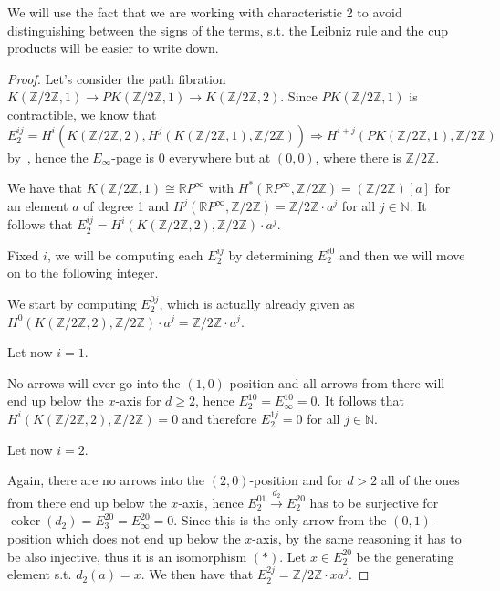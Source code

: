 \documentclass{article}
\newcommand{\numberset}{\mathbb}
\newcommand{\N}{\numberset{N}}
\newcommand{\Z}{\numberset{Z}}
\newcommand{\R}{\numberset{R}}
\newcommand{\RP}{\R P^\infty}
\newcommand{\exercise}[1]{\noindent {\bf Exercise #1}}
\DeclareMathOperator{\coker}{coker}
\begin{document}
\title{}

\author{Matteo Durante, s2303760, Leiden University}

\maketitle

\exercise{2}

    We will use the fact that we are working with characteristic 2 to avoid
    distinguishing between the signs of the terms, s.t. the Leibniz rule and the
    cup products will be easier to write down.

\begin{proof}
    Let's consider the path fibration $K(\Z/2\Z,1)\rightarrow
    PK(\Z/2\Z,1)\rightarrow K(\Z/2\Z,2)$. Since $PK(\Z/2\Z,1)$ is contractible,
    we know that $E^{ij}_2=H^i(K(\Z/2\Z,2),H^j(K(\Z/2\Z,1),\Z/2\Z))\Rightarrow
    H^{i+j}(PK(\Z/2\Z,1),\Z/2\Z)$ by~\cite[thm. 9.5]{HM19}, hence the
    $E_\infty$-page is 0 everywhere but at $(0,0)$, where there is $\Z/2\Z$.

    We have that $K(\Z/2\Z,1)\cong\RP$ with $H^*(\RP,\Z/2\Z)=(\Z/2\Z)[a]$ for an
    element $a$ of degree 1 and $H^j(\RP,\Z/2\Z)=\Z/2\Z\cdot a^j$ for all
    $j\in\N$. It follows that $E^{ij}_2=H^i(K(\Z/2\Z,2),\Z/2\Z)\cdot a^j$.

    Fixed $i$, we will be computing each $E^{ij}_2$ by determining $E^{i0}_2$
    and then we will move on to the following integer.

    We start by computing $E^{0j}_2$, which is actually already given as
    $H^0(K(\Z/2\Z,2),\Z/2\Z)\cdot a^j=\Z/2\Z\cdot a^j$.

    Let now $i=1$.
    
    No arrows will ever go into the $(1,0)$ position and all arrows from there
    will end up below the $x$-axis for $d\geq 2$, hence
    $E^{10}_2=E^{10}_\infty=0$. It follows that $H^i(K(\Z/2\Z,2),\Z/2\Z)=0$ and
    therefore $E^{1j}_2=0$ for all $j\in\N$.

    Let now $i=2$.

    Again, there are no arrows into the $(2,0)$-position and for $d>2$ all of
    the ones from there end up below the $x$-axis, hence
    $E^{01}_2\xrightarrow{d_2}E^{20}_2$ has to be surjective for
    $\coker(d_2)=E^{20}_3=E^{20}_\infty=0$. Since this is the only arrow from
    the $(0,1)$-position which does not end up below the $x$-axis, by the same
    reasoning it has to be also injective,
    thus it is an isomorphism $(*)$. Let $x\in E^{20}_2$ be the generating
    element s.t. $d_2(a)=x$. We then have that $E^{2j}_2=\Z/2\Z\cdot xa^j$.
    

\end{proof}
\end{document}
